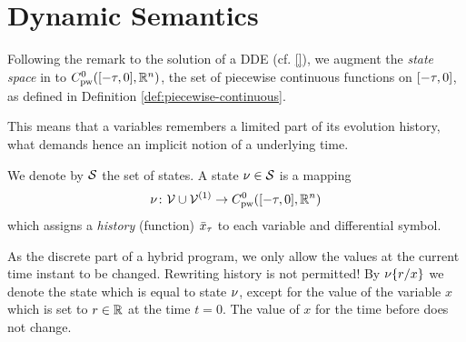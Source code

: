 \section{Dynamic Semantics}
    \label{sec:dynamic-semantics}

    Following the remark to the solution of a DDE (cf. \ref{}), we augment the \emph{state space} in \dL to $\statespace$, the set of piecewise continuous functions on $\delayinterval$, as defined in Definition \ref{def:piecewise-continuous}.

    This means that a variables remembers a limited part of its evolution history, what demands hence an implicit notion of a underlying time.

    We denote by $\states$ the set of states. A state $\asstate\in\states$ is a mapping
    \begin{equation}
        \asstate \from \allvars\cup\diffvars \to \statespace
    \end{equation}
    which assigns a \emph{history} (function) $\xbartau$ to each variable and differential symbol.


    As the discrete part of a hybrid program, we only allow the values at the current time instant to be changed.
    Rewriting history is not permitted!
    By $\modif{\asstate}{x}{r}$ we denote the state which is equal to state $\asstate$, except for the value of the variable $x$ which is set to $r\in\R$ at the time $t=0$. The value of $x$ for the time before does not change.


